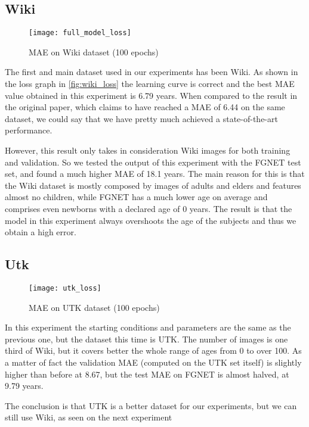 \subsection{Wiki}

\begin{wrapfigure}[17]{r}{0.5\textwidth}
  \centering
  \texttt{[image: full\_model\_loss]}
  \caption{MAE on Wiki dataset (100 epochs)}
  \label{fig:wiki_loss}
\end{wrapfigure}

The first and main dataset used in our experiments has been Wiki.
As shown in the loss graph in \autoref{fig:wiki_loss} the learning curve is
correct and the best MAE value obtained in this experiment is 6.79 years. 
When compared to the result in the original paper, which claims to have reached 
a MAE of 6.44 on the same dataset, we could say that we have pretty much achieved
a state-of-the-art performance.

However, this result only takes in consideration Wiki images for both training
and validation. So we tested the output of this experiment with the FGNET test set,
and found a much higher MAE of 18.1 years.
The main reason for this is that the Wiki dataset is mostly composed by images
of adults and elders and features almost no children, while FGNET has a much lower
age on average and comprises even newborns with a declared age of 0 years. 
The result is that the model in this experiment always overshoots the age of the 
subjects and thus we obtain a high error.

\subsection{Utk}

\begin{wrapfigure}[17]{r}{0.5\textwidth}
  \centering
  \texttt{[image: utk\_loss]}
  \caption{MAE on UTK dataset (100 epochs)}
  \label{fig:utk_loss}
\end{wrapfigure}

In this experiment the starting conditions and parameters are the same as the 
previous one, but the dataset this time is UTK. The number of images is one third
of Wiki, but it covers better the whole range of ages from 0 to over 100.
As a matter of fact the validation MAE (computed on the UTK set itself) is slightly
higher than before at 8.67, but the test MAE on FGNET is almost halved, at 9.79 years.

The conclusion is that UTK is a better dataset for our experiments, but we can still 
use Wiki, as seen on the next experiment

